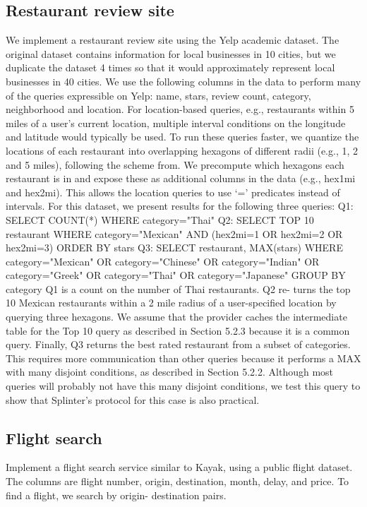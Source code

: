 \documentclass[12pt,a4paper]{article}
\begin{document}
\begin{multicols}{2}
\subsection{Restaurant review site}
We implement a restaurant review site using the Yelp academic dataset. The original dataset contains information for local businesses in 10 cities, but we duplicate the dataset 4 times so that it would approximately represent local businesses in 40 cities. We use the following columns in the data to perform many of the queries expressible on Yelp: name, stars, review count, category, neighborhood and location.
For location-based queries, e.g., restaurants within 5 miles of a user’s current location, multiple interval conditions on the longitude and latitude would typically be used. To run these queries faster, we quantize the locations of each restaurant into overlapping hexagons of different radii (e.g., 1, 2 and 5 miles), following the scheme from. We precompute which hexagons each restaurant is in and expose these as additional columns in the data (e.g., hex1mi and hex2mi). This allows the location queries to use ‘=’ predicates instead of intervals.
For this dataset, we present results for the following three queries:
Q1: SELECT COUNT(*) WHERE category="Thai"
Q2: SELECT TOP 10 restaurant
    WHERE category="Mexican" AND
    (hex2mi=1 OR hex2mi=2 OR hex2mi=3)
    ORDER BY stars
Q3: SELECT restaurant, MAX(stars)
    WHERE category="Mexican" OR
    category="Chinese" OR category="Indian"
    OR category="Greek" OR category="Thai"
    OR category="Japanese"
    GROUP BY category
Q1 is a count on the number of Thai restaurants. Q2 re- turns the top 10 Mexican restaurants within a 2 mile radius of a user-specified location by querying three hexagons. We assume that the provider caches the intermediate table for the Top 10 query as described in Section 5.2.3 because it is a common query. Finally, Q3 returns the best rated restaurant from a subset of categories. This requires more communication than other queries because it performs a MAX with many disjoint conditions, as described in Section 5.2.2. Although most queries will probably not have this many disjoint conditions, we test this query to show that Splinter’s protocol for this case is also practical.
\subsection{Flight search}
Implement a flight search service similar to 
Kayak, using a public flight dataset. The 
columns are flight number, origin, destination, 
month, delay, and price. To find a flight, we 
search by origin- destination pairs. 

\end{multicols}
\end{document}
